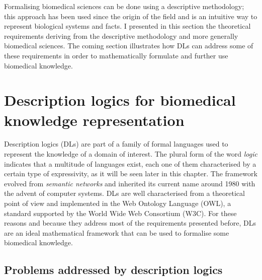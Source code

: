 Formalising biomedical sciences can be done using a descriptive methodology; this approach has been used since the origin of the field and is an intuitive way to represent biological systems and facts. I presented in this section the theoretical requirements deriving from the descriptive methodology and more generally biomedical sciences. The coming section illustrates how DLs can address some of these requirements in order to mathematically formulate and further use biomedical knowledge.

\section{Description logics for biomedical knowledge representation}

Description logics (DLs) are part of a family of formal languages used to represent the knowledge of a domain of interest. The plural form of the word \emph{logic} indicates that a multitude of languages exist, each one of them characterised by a certain type of expressivity, as it will be seen later in this chapter. The framework evolved from \emph{semantic networks} \citep{allen1982s} and inherited its current name around 1980 with the advent of computer systems. DLs are well characterised from a theoretical point of view and implemented in the Web Ontology Language (OWL), a standard supported by the World Wide Web Consortium (W3C). For these reasons and because they address most of the requirements presented before, DLs are an ideal mathematical framework that can be used to formalise some biomedical knowledge.

\subsection{Problems addressed by description logics}

